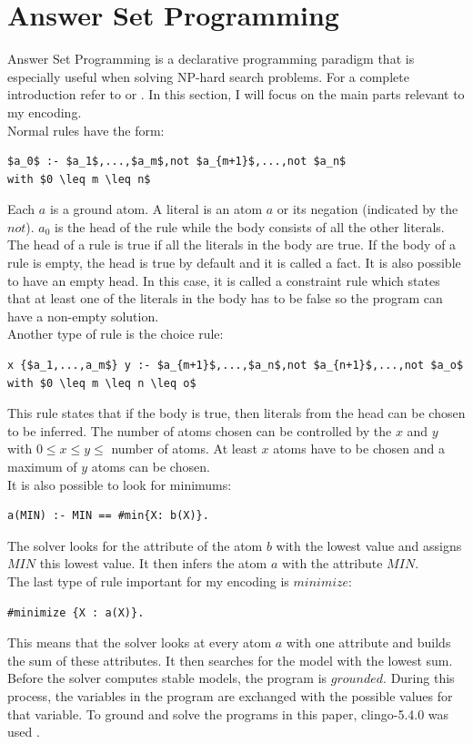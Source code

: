\documentclass[runningheads]{llncs}
\begin{document}
\section{Answer Set Programming}
Answer Set Programming is a declarative programming paradigm that is especially useful when solving NP-hard search problems. For a complete introduction refer to \cite{asp} or \cite{asp2}. In this section, I will focus on the main parts relevant to my encoding. \\
Normal rules have the form:
\begin{lstlisting}
$a_0$ :- $a_1$,...,$a_m$,not $a_{m+1}$,...,not $a_n$         
with $0 \leq m \leq n$
\end{lstlisting}
Each $a$ is a ground atom. A literal is an atom $a$ or its negation (indicated by the  $not$). $a_0$ is the head of the rule while the body consists of all the other literals. The head of a rule is true if all the literals in the body are true. If the body of a rule is empty, the head is true by default and it is called a fact. It is also possible to have an empty head. In this case, it is called a constraint rule which states that at least one of the literals in the body has to be false so the program can have a non-empty solution. \\
Another type of rule is the choice rule:
\begin{lstlisting}
x {$a_1,...,a_m$} y :- $a_{m+1}$,...,$a_n$,not $a_{n+1}$,...,not $a_o$ 
with $0 \leq m \leq n \leq o$
\end{lstlisting}
This rule states that if the body is true, then literals from the head can be chosen to be inferred. The number of atoms chosen can be controlled by the $x$ and $y$ with $0 \leq x \leq y \leq$ number of atoms. At least $x$ atoms have to be chosen and a maximum of $y$ atoms can be chosen. \\
It is also possible to look for minimums:
\begin{verbatim}
a(MIN) :- MIN == #min{X: b(X)}.
\end{verbatim}
The solver looks for the attribute of the atom $b$ with the lowest value and assigns  $MIN$ this lowest value. It then infers the atom $a$ with the attribute $MIN$. \\
The last type of rule important for my encoding is $minimize$:
\begin{verbatim}
#minimize {X : a(X)}.
\end{verbatim}
This means that the solver looks at every atom $a$ with one attribute and builds the sum of these attributes. It then searches for the model with the lowest sum. \\
Before the solver computes stable models, the program is $grounded$. During this process, the variables in the program are exchanged with the possible values for that variable.
To ground and solve the programs in this paper, clingo-5.4.0 was used \cite{clingo}.  \\
\end{document}
